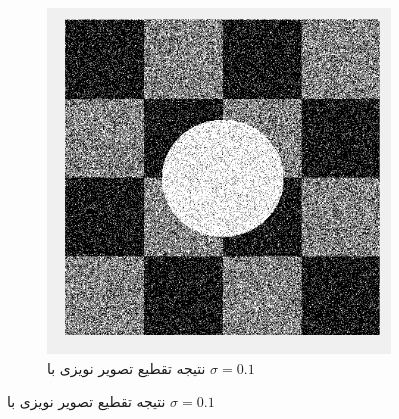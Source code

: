 \documentclass[11.5pt,a4paper]{article}
\begin{document}
\begin{figure}[h]
\begin{subfigure}{.3\textwidth}
		\includegraphics[scale=0.2]{Imgs/NB_S1_res.png}
		\caption{نتیجه تقطیع تصویر نویزی با $\sigma=0.1$}
	\end{subfigure}


\end{figure}
\end{document}
